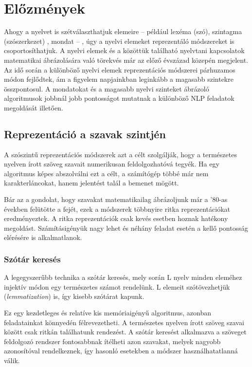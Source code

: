 \chapter{Előzmények}
\label{ch:related_work}

Ahogy a nyelvet is szétválaszthatjuk elemeire – például lexéma (szó), szintagma (szószerkezet) , mondat – , úgy a nyelvi elemeket reprezentáló módszereket is csoportosíthatjuk. A nyelvi elemek és a közöttük található nyelvtani kapcsolatok matematikai ábrázolására való törekvés már az előző évszázad közepén megjelent. Az idő során a különböző nyelvi elemek reprezentációs módszerei párhuzamos módon fejlődtek, ám a figyelem napjainkban leginkább a magasabb szintekre összpontosul. A mondatokat és a magasabb nyelvi szinteket ábrázoló algoritmusok jobbnál jobb pontosságot mutatnak a különböző NLP feladatok megoldását illetően.


\section{Reprezentáció a szavak szintjén}

A szószintű reprezentációs módszerek azt a célt szolgálják, hogy a természetes nyelven írott szöveg szavait numerikusan feldolgozhatóvá tegyék. Ha egy algoritmus képes abszolválni ezt a célt, a számítógép többé már nem karakterláncokat, hanem jelentést talál a bemenet mögött.

Bár az a gondolat, hogy szavakat matematikailag ábrázoljunk már a '80-as években felütötte a fejét, ezek a módszerek többnyire ritka reprezentációkat eredményeztek. A ritka reprezentációk csak kevés esetben hoznak hatékony megoldást. Számításigényük nagy lehet és néhány feladat esetén a kellő pontosság elérésére is alkalmatlanok.

\subsection{Szótár keresés}

A legegyszerűbb technika a szótár keresés, mely során L nyelv minden eleméhez injektív módon egy természetes számot rendelünk. L elemeit szótövezhetjük (\textit{lemmatization}) is, így kisebb szótárat kapunk.

Ez egy kezdetleges és relatíve kis memóriaigényű algoritmus, azonban feladatainkat könnyedén félrevezetheti. A természetes nyelven írott szöveg szavai között csak ritkán találhatunk rendezést. A szótár keresést alkalmazva a szöveget feldolgozó rendszer fontosabbnak ítélheti  azon szavakat, melyek nagyobb azonosítóval rendelkeznek, így hasonló esetekben a módszer használhatatlanná válik.


